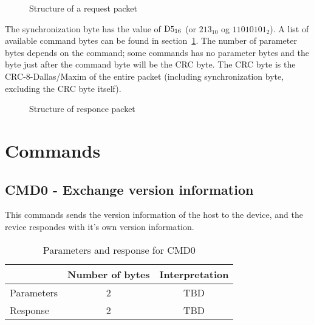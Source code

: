 \documentclass[11pt,a4paper,oneside]{memoir}
\begin{document}
\begin{figure}[htbp]
  \centering
  \vspace{2cm}
  \caption{Structure of a request packet}
  \label{fig:request-packet}
\end{figure}

The synchronization byte has the value of $\textup{D}5_{16}$ (or
$213_{10}$ og $11010101_2$). A list of available command bytes can be
found in section~\ref{sc:commands}. The number of parameter bytes
depends on the command; some commands has no parameter bytes and the
byte just after the command byte will be the CRC byte. The CRC byte is
the CRC-8-Dallas/Maxim of the entire packet (including synchronization
byte, excluding the CRC byte itself).


\begin{figure}[htbp]
  \centering
  \vspace{2cm}
  \caption{Structure of responce packet}
  \label{fig:response-packet}
\end{figure}


\section{Commands}
\label{sc:commands}

\subsection{CMD0 - Exchange version information}

This commands sends the version information of the host to the device,
and the revice respondes with it's own version information.

\begin{table}[htbp]
  \centering
  \caption{Parameters and response for CMD0}
  \label{tab:cmd0}
  \begin{tabular}{lcc}
    \toprule
    & \textbf{Number of bytes} & \textbf{Interpretation} \\
    \midrule
    Parameters & 2 & TBD \\
    Response & 2 & TBD \\
    \bottomrule
  \end{tabular}
\end{table}
\end{document}
